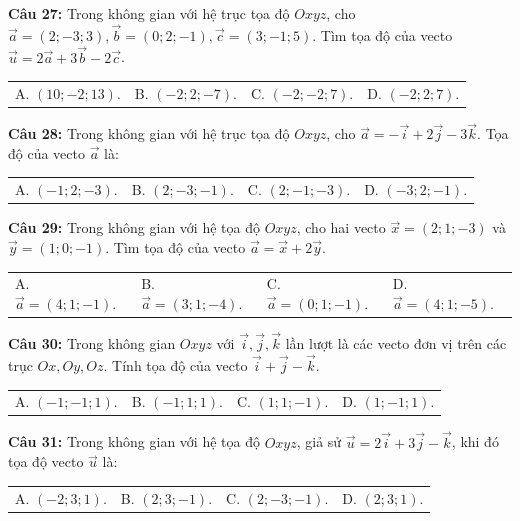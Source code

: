 \documentclass[12pt]{article}
\begin{document}
	\vspace{2mm}
	\noindent \textbf{Câu 27:} Trong không gian với hệ trục tọa độ $Oxyz$, cho $\vec{a} = (2; -3; 3), \vec{b} = (0; 2; -1), \vec{c} = (3; -1; 5)$. Tìm tọa độ của vecto $\vec{u} = 2\vec{a} + 3\vec{b} - 2\vec{c}$. \\
	\noindent
	\begin{tabular}{p{} p{} p{} p{}}
		A. $(10; -2; 13)$. & B. $(-2; 2; -7)$. & C. $(-2; -2; 7)$. & D. $(-2; 2; 7)$.
	\end{tabular}
	
	\vspace{2mm}
	\noindent \textbf{Câu 28:} Trong không gian với hệ trục tọa độ $Oxyz$, cho $\vec{a} = -\vec{i} + 2\vec{j} - 3\vec{k}$. Tọa độ của vecto $\vec{a}$ là: \\
	\noindent
	\begin{tabular}{p{} p{} p{} p{}}
		A. $(-1; 2; -3)$. & B. $(2; -3; -1)$. & C. $(2; -1; -3)$. & D. $(-3; 2; -1)$.
	\end{tabular}
	
	\vspace{2mm}
	\noindent \textbf{Câu 29:} Trong không gian với hệ tọa độ $Oxyz$, cho hai vecto $\vec{x} = (2; 1; -3)$ và $\vec{y} = (1; 0; -1)$. Tìm tọa độ của vecto $\vec{a} = \vec{x} + 2\vec{y}$. \\
	\noindent
	\begin{tabular}{p{} p{} p{} p{}}
		A. $\vec{a} = (4; 1; -1)$. & B. $\vec{a} = (3; 1; -4)$. & C. $\vec{a} = (0; 1; -1)$. & D. $\vec{a} = (4; 1; -5)$.
	\end{tabular}
	
	\vspace{2mm}
	\noindent \textbf{Câu 30:} Trong không gian $Oxyz$ với $\vec{i}, \vec{j}, \vec{k}$ lần lượt là các vecto đơn vị trên các trục $Ox, Oy, Oz$. Tính tọa độ của vecto $\vec{i} + \vec{j} - \vec{k}$. \\
	\noindent
	\begin{tabular}{p{} p{} p{} p{}}
		A. $( -1; -1; 1)$. & B. $(-1; 1; 1)$. & C. $(1; 1; -1)$. & D. $(1; -1; 1)$.
	\end{tabular}
	
	\vspace{2mm}
	\noindent \textbf{Câu 31:} Trong không gian với hệ tọa độ $Oxyz$, giả sử $\vec{u} = 2\vec{i} + 3\vec{j} - \vec{k}$, khi đó tọa độ vecto $\vec{u}$ là: \\
	\noindent
	\begin{tabular}{p{} p{} p{} p{}}
		A. $(-2; 3; 1)$. & B. $(2; 3; -1)$. & C. $(2; -3; -1)$. & D. $(2; 3; 1)$.
	\end{tabular}
	
\end{document}
